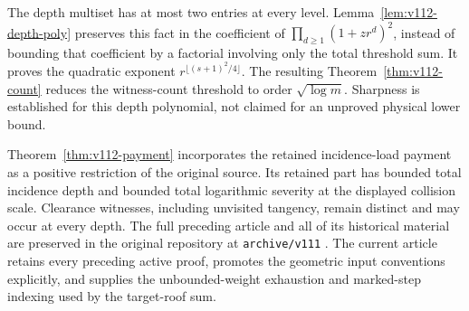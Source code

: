 \documentclass[11pt,reqno]{amsart}
\numberwithin{equation}{section}
\theoremstyle{definition}\newtheorem{definition}[theorem]{Definition}
\theoremstyle{remark}\newtheorem{remark}[theorem]{Remark}
\begin{document}
The depth multiset has at most two entries at every level.
Lemma~\ref{lem:v112-depth-poly} preserves this fact in the
coefficient of $\prod_{d\ge1}(1+zr^d)^2$, instead of bounding that
coefficient by a factorial involving only the total threshold sum.
It proves the quadratic exponent
$r^{\lfloor(s+1)^2/4\rfloor}$. The resulting
Theorem~\ref{thm:v112-count} reduces the witness-count threshold to
order $\sqrt{\log m}$. Sharpness is established for this depth
polynomial, not claimed for an unproved physical lower bound.

Theorem~\ref{thm:v112-payment} incorporates the retained incidence-load payment as a
positive restriction of the original source. Its retained part has
bounded total incidence depth and bounded total logarithmic severity
at the displayed collision scale. Clearance witnesses, including
unvisited tangency, remain distinct and may occur at every depth.
The full preceding article and all of its historical material are
preserved in the original repository at \texttt{archive/v111} \cite{Q111}. The current article
retains every preceding active proof, promotes the geometric input
conventions explicitly, and supplies the unbounded-weight exhaustion
and marked-step indexing used by the target-roof sum.
\end{document}
